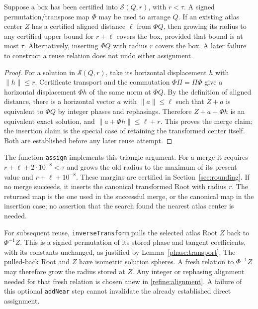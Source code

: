 \begin{lemma}\label{refine:atlas-assignment}
Suppose a box has been certified into $\mathcal S(Q,r)$, with $r<\tau$.
A signed permutation/transpose map $\Phi$ may be used to arrange $Q$.
If an existing atlas center $Z$ has a certified aligned distance
$\ell$ from $\Phi Q$, then growing its radius to any certified upper
bound for $r+\ell$ covers the box, provided that bound is at most
$\tau$.  Alternatively, inserting $\Phi Q$ with radius $r$ covers
the box.  A later failure to construct a reuse relation does not undo
either assignment.
\end{lemma}

\begin{proof}
For a solution in $\mathcal S(Q,r)$, take its horizontal displacement
$h$ with $\|h\|\leq r$.  Certificate transport and the commutation
$\Phi\Pi=\Pi\Phi$ give a horizontal displacement $\Phi h$ of the
same norm at $\Phi Q$.  By the definition of aligned distance, there
is a horizontal vector $a$ with $\|a\|\leq\ell$ such that $Z+a$ is
equivalent to $\Phi Q$ by integer phases and rephasings.  Therefore
$Z+a+\Phi h$ is an equivalent exact solution, and
$\|a+\Phi h\|\leq\ell+r$.  This proves the merge claim; the insertion
claim is the special case of retaining the transformed center itself.
Both are established before any later reuse attempt.
\end{proof}

The function \texttt{assign} implements this triangle argument.  For
a merge it requires $r+\ell+2\cdot10^{-8}<\tau$ and grows the old
radius to the maximum of its present value and
$r+\ell+10^{-8}$.  These margins are certified in
Section~\ref{sec:rounding}.  If no merge succeeds, it inserts the
canonical transformed Root with radius $r$.  The returned map is the
one used in the successful merge, or the canonical map in the insertion
case; no assertion that the search found the nearest atlas center is
needed.

For subsequent reuse, \texttt{inverseTransform} pulls the selected
atlas Root $Z$ back to $\Phi^{-1}Z$.  This is a signed
permutation of its stored phase and tangent coefficients, with its
constants unchanged, as justified by Lemma~\ref{phase:transport}.
The pulled-back Root and $Z$ have isometric solution spheres.  A fresh
relation to $\Phi^{-1}Z$ may therefore grow the radius stored at $Z$.
Any integer or rephasing alignment needed for that fresh relation is
chosen anew in \eqref{refine:alignment}.  A failure of this optional
\texttt{addNear} step cannot invalidate the already established direct
assignment.

